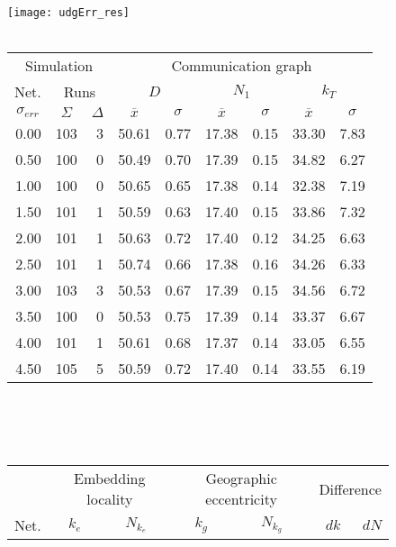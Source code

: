 \documentclass{article}
\begin{document}
\begin{figure}[h]
\begin{center}
\texttt{[image: udgErr\_res]}
~\\~\\
\begin{tabular}{|r|rr|rr|rr|rr|}
\hline
\multicolumn{3}{|c|}{Simulation} & \multicolumn{6}{|c|}{Communication graph}\\
\multicolumn{1}{|c}{Net.} & \multicolumn{2}{c|}{Runs} & \multicolumn{2}{|c}{$D$} & \multicolumn{2}{c}{$N_1$} & \multicolumn{2}{c|}{$k_T$}\\
\hline
\multicolumn{1}{|c|}{$\sigma_{err}$} & \multicolumn{1}{|c}{$\Sigma$} & \multicolumn{1}{c|}{$\Delta$} & \multicolumn{1}{|c}{$\overline{x}$} & \multicolumn{1}{c|}{$\sigma$} & \multicolumn{1}{|c}{$\overline{x}$} & \multicolumn{1}{c|}{$\sigma$} & \multicolumn{1}{|c}{$\overline{x}$} & \multicolumn{1}{c|}{$\sigma$}\\
0.00 & 103 & 3 & 50.61 & 0.77 & 17.38 & 0.15 & 33.30 & 7.83\\
0.50 & 100 & 0 & 50.49 & 0.70 & 17.39 & 0.15 & 34.82 & 6.27\\
1.00 & 100 & 0 & 50.65 & 0.65 & 17.38 & 0.14 & 32.38 & 7.19\\
1.50 & 101 & 1 & 50.59 & 0.63 & 17.40 & 0.15 & 33.86 & 7.32\\
2.00 & 101 & 1 & 50.63 & 0.72 & 17.40 & 0.12 & 34.25 & 6.63\\
2.50 & 101 & 1 & 50.74 & 0.66 & 17.38 & 0.16 & 34.26 & 6.33\\
3.00 & 103 & 3 & 50.53 & 0.67 & 17.39 & 0.15 & 34.56 & 6.72\\
3.50 & 100 & 0 & 50.53 & 0.75 & 17.39 & 0.14 & 33.37 & 6.67\\
4.00 & 101 & 1 & 50.61 & 0.68 & 17.37 & 0.14 & 33.05 & 6.55\\
4.50 & 105 & 5 & 50.59 & 0.72 & 17.40 & 0.14 & 33.55 & 6.19\\
\hline
\end{tabular}\\
~\\~\\
\begin{tabular}{|r|rr|rr|rr|rr|rr|}
\hline
& \multicolumn{4}{|c|}{Embedding locality} & \multicolumn{4}{|c|}{Geographic eccentricity} & \multicolumn{2}{|c|}{Difference}\\
Net. & \multicolumn{2}{c}{$k_e$} & \multicolumn{2}{c|}{$N_{k_e}$} & \multicolumn{2}{c}{$k_g$} & \multicolumn{2}{c|}{$N_{k_g}$}& $dk$ & $dN$\\

\end{tabular}
\end{center}
\end{figure}
\end{document}

